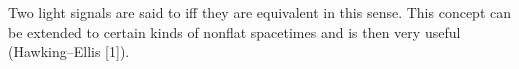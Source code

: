 Two light signals are said to  iff they are equivalent in this sense. This concept can be extended to certain kinds of nonflat spacetimes and is then very useful (Hawking–Ellis [1]).
